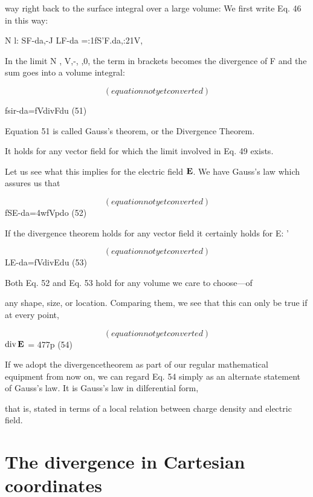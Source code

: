 way right back to the surface integral over a large volume: We first
write Eq. 46 in this way:

N l: SF-da,-J
LF-da =:1fS'F.da,:21V,~  

In the limit N , V,-, \rightarrow,0, the term in brackets becomes the divergence
of F and the sum goes into a volume integral:

\begin{equation}
(equation not yet converted)
\end{equation}

fsir-da=fVdivFdu (51)

Equation 51 is called Gauss's theorem, or the Divergence Theorem.

It holds for any vector field for which the limit involved in Eq. 49
exists.

Let us see what this implies for the electric field $\mathbf{E}$. We have
Gauss's law which assures us that

\begin{equation}
(equation not yet converted)
\end{equation}
fSE-da=4wfVpdo (52)

If the divergence theorem holds for any vector field it certainly holds
for E: '

\begin{equation}
(equation not yet converted)
\end{equation}
LE-da=fVdivEdu (53)

Both Eq. 52 and Eq. 53 hold for any volume we care to choose---of

any shape, size, or location. Comparing them, we see that this can
only be true if at every point,

\begin{equation}
(equation not yet converted)
\end{equation}
$\operatorname{div}\mathbf{E}$ = 477p (54)

If we adopt the divergencetheorem as part of our regular mathematical
equipment from now on, we can regard Eq. 54 simply as an alternate
statement of Gauss's law. It is Gauss's law in dilferential form,

that is, stated in terms of a local relation between charge density and
electric field.

\section{The divergence in Cartesian coordinates}


